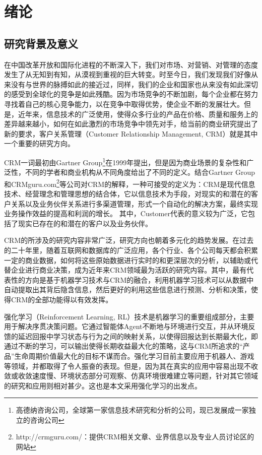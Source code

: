 \chapter{绪论}

\section{研究背景及意义}
在中国改革开放和国际化进程的不断深入下，我们对市场、对营销、对管理的态度发生了从无知到有知，从漠视到重视的巨大转变。时至今日，我们发现我们好像从来没有与世界的脉搏如此的接近过，同样，我们的企业和国家也从来没有如此深切的感受到全球化的竞争是如此残酷。因为市场竞争的不断加剧，每个企业都在努力寻找着自己的核心竞争能力，以在竞争中取得优势，使企业不断的发展壮大。但是，近年来，信息技术的广泛使用，使得众多行业的产品在价格、质量和服务上的差异越来越小，如何在如此激烈的市场竞争中领先对手，给当前的商业研究提出了新的要求，客户关系管理（Customer Relationship Management, CRM）就是其中一个重要的研究方向。

CRM一词最初由Gartner Group\footnote{高德纳咨询公司，全球第一家信息技术研究和分析的公司，现已发展成一家独立的咨询公司}在1999年提出，但是因为商业场景的复杂性和广泛性，不同的学者和商业机构从不同角度给出了不同的定义。结合Gartner Group和CRMguru.com\footnote{http://crmguru.com/：提供CRM相关文章、业界信息以及专业人员讨论区的网站}等公司对CRM的解释，一种可接受的定义为：CRM是现代信息技术、经营理念和管理思想的结合体，它以信息技术为手段，对现实的和潜在的客户关系以及业务伙伴关系进行多渠道管理，形式一个自动化的解决方案，最终实现业务操作效益的提高和利润的增长\citep{客户关系管理丁建石}。
其中，Customer代表的意义较为广泛，它包括了现实已存在的和潜在的客户以及业务伙伴。

CRM的所涉及的研究内容非常广泛，研究方向也朝着多元化的趋势发展\citep{王广宇2013客户关系管理}。在过去的二十年里，随着互联网和数据库的广泛应用，各个行业、各个公司每天都会积累一定的商业数据，如何将这些原始数据进行实时的和更深层次的分析，以辅助或代替企业进行商业决策，成为近年来CRM领域最为活跃的研究内容。其中，最有代表性的方向是基于机器学习技术与CRM的融合，利用机器学习技术可以从数据中自动提取出其背后隐含信息，然后更好的利用这些信息进行预测、分析和决策，使得CRM的全部功能得以有效发挥。

强化学习（Reinforcement Learning, RL）技术是机器学习的重要组成部分，主要用于解决序贯决策问题。它通过智能体Agent不断地与环境进行交互，并从环境反馈的延迟回报中学习状态与行为之间的映射关系，以使得回报达到长期最大化，即通过不断的学习，可以输出使得长期收益最大化的策略，这与CRM所追求的“产品”生命周期价值最大化的目标不谋而合。强化学习目前主要应用于机器人、游戏等领域，并都取得了令人振奋的表现。但是，因为其在真实的应用中容易出现不收敛或收敛速度慢、环境状态部分可观察、仿真环境很难建立等问题，针对其它领域的研究和应用则相对甚少。这也是本文采用强化学习的出发点。


